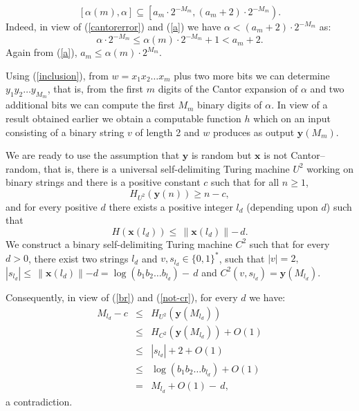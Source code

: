 \documentclass[12pt]{iopart}
\begin{document}
\begin{equation}
\label{inclusion}
[\alpha(m), \alpha] \subseteq \left[a_{m}\cdot 2^{-M_{m}}, (a_{m}+2)\cdot
2^{-M_{m}}\right).
\end{equation}
Indeed, in view of (\ref{cantorerror})
and (\ref{a}) we have $\alpha < (a_{m}+2)\cdot 2^{-M_{m}}$ as:
\[\alpha \cdot 2^{-M_{m}} \le \alpha(m) \cdot 2^{-M_{m}} +1 < a_{m} +2. \]
Again from (\ref{a}), $ a_{m} \le \alpha(m)\cdot 2^{M_{m}}$.


Using (\ref{inclusion}),  from $w= x_1 x_2 \ldots x_m$ plus two more bits we
can determine $y_{1} y_{2} \ldots y_{M_{m}}$, that is, from the first $m$
digits of the Cantor expansion of $\alpha$ and two additional bits we can
compute the first $M_{m}$ binary digits of $\alpha$. In view of
a result obtained earlier
we obtain
a computable function $h$ which  on  an input consisting of a binary string
$v$ of length 2
and $w$  produces as output ${\mathbf y} (M_{m})$.

We are ready to use the assumption  that
${\mathbf y}$ is  random but ${\mathbf x}$ is not Cantor--random, that is, there is
  a universal self-delimiting Turing machine $U^{2}$ working
on binary strings and there is
 a positive constant $c$ such that for all $n\ge 1$,
\begin{equation}
\label{br}
H_{U^{2}} ({\mathbf y}(n)) \ge n-c,
\end{equation}
and
 for every positive $d$ there exists a positive integer $l_{d}$ (depending
upon $d$) such that
\begin{equation}
\label{not-cr}
H({\mathbf x}(l_{d})) \le \, \parallel {\mathbf x}(l_{d})
\parallel - \, d.
\end{equation}
We construct a binary self-delimiting Turing machine $C^{2}$
such that for every $d>0$, there exist two strings $l_{d}$ and $v,
s_{l_{d}}\in \{0,1\}^{*}$, such that $|v| = 2,$  $|s_{l_{d}}| \le
\,\parallel  {\mathbf x}(l_{d}) \parallel -d = \log (b_{1} b_{2}\ldots b_{l_{d}}) -\, d$
and $C^{2}(v, s_{l_{d}}) = {\mathbf y}(M_{l_{d}})$.

Consequently, in view of (\ref{br}) and (\ref{not-cr}),  for every $d$ we
have:
\begin{eqnarray*}
M_{l_{d}} -c & \le &  H_{U^{2}}({\mathbf y}(M_{l_{d}}))\\
& \le &  H_{C^{2}}({\mathbf y}(M_{l_{d}})) + O(1)\\
& \le & |s_{l_{d}}| + 2 + O(1)\\
& \le & \log (b_{1} b_{2}\ldots b_{l_{d}}) + O(1)\\
& = &  M_{l_{d}} + O(1) -  \,d,
\end{eqnarray*}
a contradiction.
\end{document}
